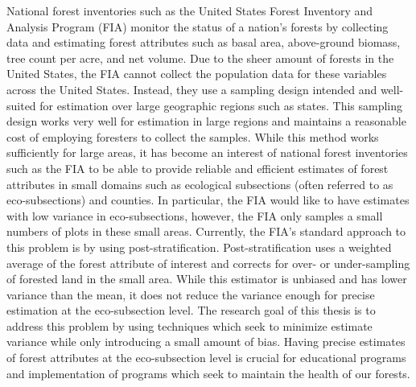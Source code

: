 \documentclass[12pt,twoside]{reedthesis}
\begin{document}
National forest inventories such as the United States Forest Inventory and Analysis Program (FIA) monitor the status of a nation's forests by collecting data and estimating forest attributes such as basal area, above-ground biomass, tree count per acre, and net volume. Due to the sheer amount of forests in the United States, the FIA cannot collect the population data for these variables across the United States. Instead, they use a sampling design intended and well-suited for estimation over large geographic regions such as states. This sampling design works very well for estimation in large regions and maintains a reasonable cost of employing foresters to collect the samples. While this method works sufficiently for large areas, it has become an interest of national forest inventories such as the FIA to be able to provide reliable and efficient estimates of forest attributes in small domains such as ecological subsections (often referred to as eco-subsections) and counties. In particular, the FIA would like to have estimates with low variance in eco-subsections, however, the FIA only samples a small numbers of plots in these small areas. Currently, the FIA's standard approach to this problem is by using post-stratification. Post-stratification uses a weighted average of the forest attribute of interest and corrects for over- or under-sampling of forested land in the small area. While this estimator is unbiased and has lower variance than the mean, it does not reduce the variance enough for precise estimation at the eco-subsection level. The research goal of this thesis is to address this problem by using techniques which seek to minimize estimate variance while only introducing a small amount of bias. Having precise estimates of forest attributes at the eco-subsection level is crucial for educational programs and implementation of programs which seek to maintain the health of our forests.
\end{document}
